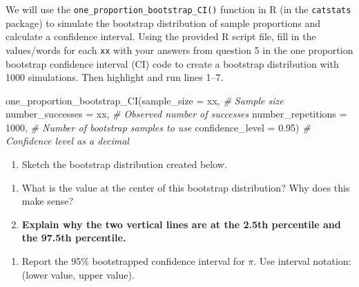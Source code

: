 \documentclass[
]{report}
\newenvironment{Shaded}{\begin{snugshade}}{\end{snugshade}}
\newcommand{\AttributeTok}[1]{\textcolor[rgb]{0.77,0.63,0.00}{#1}}
\newcommand{\CommentTok}[1]{\textcolor[rgb]{0.56,0.35,0.01}{\textit{#1}}}
\newcommand{\DecValTok}[1]{\textcolor[rgb]{0.00,0.00,0.81}{#1}}
\newcommand{\FloatTok}[1]{\textcolor[rgb]{0.00,0.00,0.81}{#1}}
\newcommand{\FunctionTok}[1]{\textcolor[rgb]{0.00,0.00,0.00}{#1}}
\newcommand{\NormalTok}[1]{#1}
\providecommand{\tightlist}{%
  \setlength{\itemsep}{0pt}\setlength{\parskip}{0pt}}
\begin{document}
\vspace{.1in}

We will use the \texttt{one\_proportion\_bootstrap\_CI()} function in R (in the \texttt{catstats} package) to simulate the bootstrap distribution of sample proportions and calculate a confidence interval. Using the provided R script file, fill in the values/words for each \texttt{xx} with your answers from question 5 in the one proportion bootstrap confidence interval (CI) code to create a bootstrap distribution with 1000 simulations. Then highlight and run lines 1--7.

\begin{Shaded}
\begin{Highlighting}[]
\FunctionTok{one\_proportion\_bootstrap\_CI}\NormalTok{(}\AttributeTok{sample\_size =}\NormalTok{ xx, }\CommentTok{\# Sample size}
                    \AttributeTok{number\_successes =}\NormalTok{ xx, }\CommentTok{\# Observed number of successes}
                    \AttributeTok{number\_repetitions =} \DecValTok{1000}\NormalTok{, }\CommentTok{\# Number of bootstrap samples to use}
                    \AttributeTok{confidence\_level =} \FloatTok{0.95}\NormalTok{) }\CommentTok{\# Confidence level as a decimal}
\end{Highlighting}
\end{Shaded}

\newpage

\begin{enumerate}
\def\labelenumi{\arabic{enumi}.}
\setcounter{enumi}{5}
\tightlist
\item
  Sketch the bootstrap distribution created below.
\end{enumerate}

\vspace{1.8in}

\begin{enumerate}
\def\labelenumi{\arabic{enumi}.}
\setcounter{enumi}{6}
\item
  What is the value at the center of this bootstrap distribution? Why does this make sense?
  \vspace{.8in}
\item
  \textbf{Explain why the two vertical lines are at the 2.5th percentile and the 97.5th percentile.}
\end{enumerate}

\vspace{.7in}

\begin{enumerate}
\def\labelenumi{\arabic{enumi}.}
\setcounter{enumi}{8}
\tightlist
\item
  Report the 95\% bootstrapped confidence interval for \(\pi\). Use interval notation: (lower value, upper value).
\end{enumerate}
\end{document}

